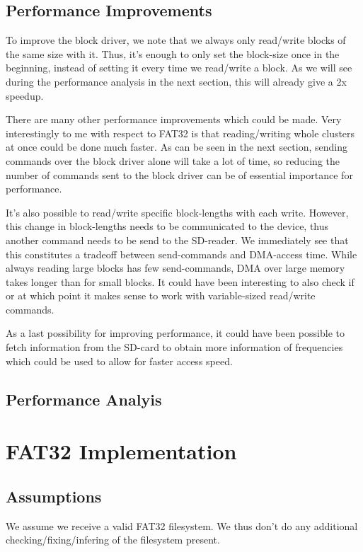 \subsection{Performance Improvements}
To improve the block driver, we note that we always only read/write blocks of the 
same size with it. Thus, it's enough to only set the block-size once in the beginning,
instead of setting it every time we read/write a block. As we will see during the 
performance analysis in the next section, this will already give a 2x speedup.

There are many other performance improvements which could be made.
Very interestingly to me with respect to FAT32 is that reading/writing whole 
clusters at once could be done much faster. As can be seen in the next section,
sending commands over the block driver alone will take a lot of time, 
so reducing the number of commands sent to the block driver can be of essential 
importance for performance.

It's also possible to read/write specific block-lengths with each write.
However, this change in block-lengths needs to be communicated to the device,
thus another command needs to be send to the SD-reader. We immediately see 
that this constitutes a tradeoff between send-commands and DMA-access time.
While always reading large blocks has few send-commands, DMA over large memory 
takes longer than for small blocks. It could have been interesting to also 
check if or at which point it makes sense to work with variable-sized read/write 
commands.

As a last possibility for improving performance, it could have been possible 
to fetch information from the SD-card to obtain more information of frequencies 
which could be used to allow for faster access speed.

\subsection{Performance Analyis}

\section{FAT32 Implementation}

\subsection{Assumptions}
We assume we receive a valid FAT32 filesystem. We thus don't do any additional 
checking/fixing/infering of the filesystem present.

